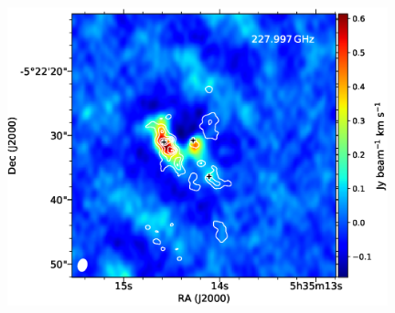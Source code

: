 \begin{figure}[H]
\begin{center}
\begin{minipage}{0.98\textwidth}
\begin{center}
\begin{minipage}{0.48\textwidth}
\begin{center}
\includegraphics[width=0.98\textwidth]{OrionKL/mom0/227.997SV_mom0_3-7.eps}
\end{center}
\end{minipage}
\end{center}
\end{minipage}


\end{center}
\end{figure}
